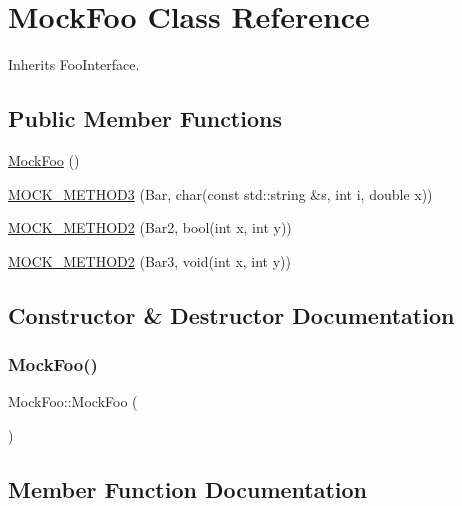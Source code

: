 \hypertarget{classMockFoo}{}\section{Mock\+Foo Class Reference}
\label{classMockFoo}


Inherits Foo\+Interface.

\subsection*{Public Member Functions}
\begin{DoxyCompactItemize}
\item 
\mbox{\hyperlink{classMockFoo_a2821e632963d0ea4af66a7ce7ed36a8f}{Mock\+Foo}} ()
\item 
\mbox{\hyperlink{classMockFoo_a8f323a65afd93c0605a02b278b101d18}{M\+O\+C\+K\+\_\+\+M\+E\+T\+H\+O\+D3}} (Bar, char(const std\+::string \&s, int i, double x))
\item 
\mbox{\hyperlink{classMockFoo_ae1d53263d5efcf38fda3990302fac6ab}{M\+O\+C\+K\+\_\+\+M\+E\+T\+H\+O\+D2}} (Bar2, bool(int x, int y))
\item 
\mbox{\hyperlink{classMockFoo_af1e0c374cadacdaa7ca69f9c38d85543}{M\+O\+C\+K\+\_\+\+M\+E\+T\+H\+O\+D2}} (Bar3, void(int x, int y))
\end{DoxyCompactItemize}


\subsection{Constructor \& Destructor Documentation}
\mbox{\label{classMockFoo_a2821e632963d0ea4af66a7ce7ed36a8f}} 
\subsubsection{\texorpdfstring{MockFoo()}{MockFoo()}}
{\footnotesize\ttfamily Mock\+Foo\+::\+Mock\+Foo (\begin{DoxyParamCaption}{ }\end{DoxyParamCaption})\hspace{0.3cm}{\ttfamily [inline]}}



\subsection{Member Function Documentation}
\mbox{\label{classMockFoo_ae1d53263d5efcf38fda3990302fac6ab}} 
